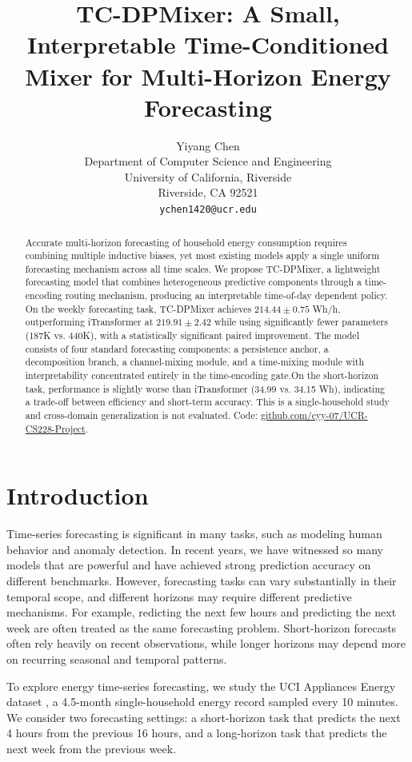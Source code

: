 \documentclass{article}
\title{TC-DPMixer: A Small, Interpretable Time-Conditioned Mixer for
       Multi-Horizon Energy Forecasting}
\author{%
  Yiyang Chen \\
  Department of Computer Science and Engineering\\
  University of California, Riverside\\
  Riverside, CA 92521 \\
  \texttt{ychen1420@ucr.edu} \\
}
\begin{document}
\maketitle

\begin{abstract}
Accurate multi-horizon forecasting of household energy consumption requires combining multiple inductive biases, yet most existing models apply a single uniform forecasting mechanism across all time scales. We propose TC-DPMixer, a lightweight forecasting model that combines heterogeneous predictive components through a time-encoding routing mechanism, producing an interpretable time-of-day dependent policy. On the weekly forecasting task, TC-DPMixer achieves $214.44 \pm 0.75$ Wh/h, outperforming iTransformer at $219.91 \pm 2.42$ while using significantly fewer parameters (187K vs. 440K), with a statistically significant paired improvement.  The model consists of four standard forecasting components: a persistence anchor, a decomposition branch, a channel-mixing module, and a time-mixing module  with interpretability concentrated entirely in the time-encoding gate.On the short-horizon task, performance is slightly worse than iTransformer (34.99 vs. 34.15 Wh), indicating a trade-off between efficiency and short-term accuracy.
This is a single-household study and cross-domain generalization is not evaluated. Code: \href{https://github.com/cyy-07/UCR-CS228-Project}{github.com/cyy-07/UCR-CS228-Project}.
\end{abstract}

\section{Introduction}

Time-series forecasting is significant in many tasks, such as modeling human behavior and anomaly detection. In recent years, we have witnessed so many models that are powerful and have achieved strong prediction accuracy on different benchmarks. However, forecasting tasks can vary substantially in their temporal scope, and different horizons may require different predictive mechanisms. For example, redicting the next few hours and predicting the next week are often treated as the same forecasting problem. Short-horizon forecasts often rely heavily on recent observations, while longer horizons may depend more on recurring seasonal and temporal patterns.

To explore energy time-series forecasting, we study the UCI Appliances Energy dataset \citep{candanedo2017}, a 4.5-month single-household energy record sampled every 10 minutes. We consider two forecasting settings: a short-horizon task that predicts the next 4 hours from the previous 16 hours, and a long-horizon task that predicts the next week from the previous week.
\end{document}
